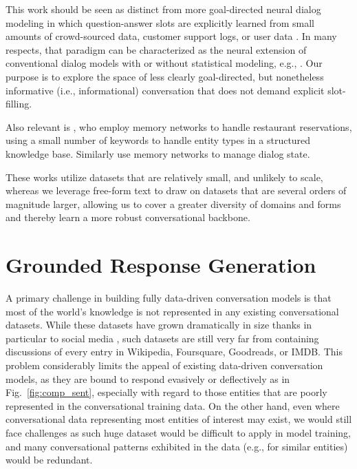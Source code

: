 \documentclass[letterpaper]{article}
\begin{document}
This work should be seen as distinct from more goal-directed neural dialog modeling in which question-answer slots are explicitly learned from small amounts of crowd-sourced data, customer support logs, or user data
\cite{wen-EtAl2015,DBLP:journals/corr/WenGMRSVY16,Wen2017Latent,Zhao2017ACL}.
In many respects, that paradigm
can be characterized as the neural extension of conventional dialog models with or without statistical modeling, e.g., \cite{OhRudnicky2000,Ratnaparkhi2002,BanchsLi2012,AmeixaCoheurEtAl2014}.
Our purpose is to explore the space of less clearly goal-directed, but nonetheless informative (i.e., informational) conversation that does not demand explicit slot-filling.

Also relevant is \cite{BordesW16}, who employ memory networks to handle restaurant reservations, using a small number of keywords to handle entity types in a structured knowledge base.
Similarly \cite{DBLP:conf/eacl/LiuP17a} use memory networks to manage dialog state.

These works utilize datasets that are relatively small, and unlikely to scale, whereas
we leverage free-form text to draw on datasets that are several orders of magnitude larger,
allowing us to cover a greater diversity of domains and forms and thereby learn a more robust conversational backbone.

\section{Grounded Response Generation}

A primary challenge in building fully data-driven conversation models is that most of the world's knowledge is not represented in any existing conversational datasets.
While these datasets \cite{corpora:2015} have grown dramatically in size thanks in particular to social media \cite{ritter2011data}, such datasets are still very far from containing discussions of every entry in Wikipedia, Foursquare, Goodreads, or IMDB. %
This problem considerably limits the appeal of existing data-driven conversation models, as they are bound to respond evasively or deflectively
as in Fig.~\ref{fig:comp_sent}, especially with regard to those entities that are poorly represented in the conversational training data.
On the other hand, even where conversational data representing most entities of interest may exist, we would still face challenges as such huge dataset would be difficult to apply in model training, and many conversational patterns exhibited in the data (e.g., for similar entities) would be redundant.
\end{document}
